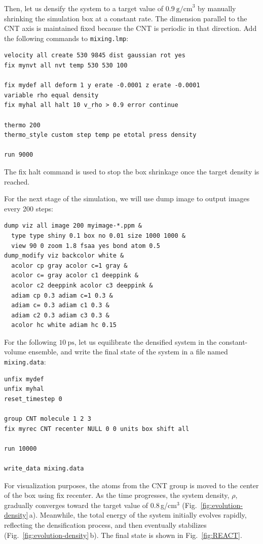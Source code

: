 \documentclass[9pt,tutorial]{livecoms}
\newcommand{\lmpcmd}[1]{\hspace{0pt}\colorbox{listing}{\textcolor{command}{\small{#1}}}\hspace{0pt}} %
\newcommand{\flecmd}[1]{\textcolor{command}{\texttt{#1}}} %
\begin{document}
Then, let us densify the system to a target value of $0.9~\text{g/cm}^3$
by manually shrinking the simulation box at a constant rate.  The dimension parallel
to the CNT axis is maintained fixed because the CNT is periodic in that direction.
Add the following commands to \flecmd{mixing.lmp}:
\begin{lstlisting}
velocity all create 530 9845 dist gaussian rot yes
fix mynvt all nvt temp 530 530 100

fix mydef all deform 1 y erate -0.0001 z erate -0.0001
variable rho equal density
fix myhal all halt 10 v_rho > 0.9 error continue

thermo 200
thermo_style custom step temp pe etotal press density

run 9000
\end{lstlisting}
The \lmpcmd{fix halt} command is used to stop the box shrinkage once the
target density is reached. 

For the next stage of the simulation, we will use \lmpcmd{dump image} to
output images every 200 steps:
\begin{lstlisting}
dump viz all image 200 myimage-*.ppm &
  type type shiny 0.1 box no 0.01 size 1000 1000 &
  view 90 0 zoom 1.8 fsaa yes bond atom 0.5
dump_modify viz backcolor white &
  acolor cp gray acolor c=1 gray &
  acolor c= gray acolor c1 deeppink &
  acolor c2 deeppink acolor c3 deeppink &
  adiam cp 0.3 adiam c=1 0.3 &
  adiam c= 0.3 adiam c1 0.3 &
  adiam c2 0.3 adiam c3 0.3 &
  acolor hc white adiam hc 0.15
\end{lstlisting}
For the following $10~\text{ps}$, let us equilibrate the densified system
in the constant-volume ensemble, and write the final state of the
system in a file named \flecmd{mixing.data}:
\begin{lstlisting}
unfix mydef
unfix myhal
reset_timestep 0

group CNT molecule 1 2 3
fix myrec CNT recenter NULL 0 0 units box shift all

run 10000

write_data mixing.data
\end{lstlisting}
For visualization purposes, the atoms from the CNT \lmpcmd{group} is moved
to the center of the box using \lmpcmd{fix recenter}.
As the time progresses, the system density,
$\rho$, gradually converges toward the target value of $0.8$\,g/cm$^3$ (Fig.~\ref{fig:evolution-density}\,a).
Meanwhile, the total energy of the system initially evolves rapidly, reflecting the
densification process, and then eventually stabilizes (Fig.~\ref{fig:evolution-density}\,b).
The final state is shown in Fig.~\ref{fig:REACT}.
\end{document}
